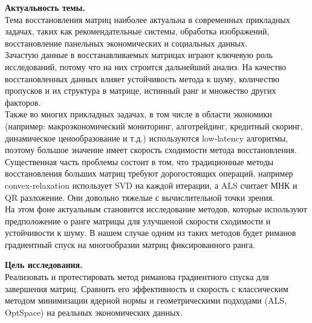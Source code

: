 \documentclass[a4paper,12pt]{article}
\begin{document}
\textbf{Актуальность темы.} \\[5pt] Тема восстановления матриц наиболее актуальна в современных прикладных задачах, таких как рекомендательные системы, обработка изображений, восстановление панельных экономических и социальных данных. \\[5pt] Зачастую данные в восстанавливаемых матрицах играют ключевую роль исследований, потому что на них строится дальнейший анализ. На качество восстановленных данных влияет устойчивость метода к шуму, количество пропусков и их структура в матрице, истинный ранг и множество других факторов. \\[5pt] Также во многих прикладных задачах, в том числе в области экономики (например: макроэкономический мониторинг, алготрейдинг, кредитный скоринг, динамическое ценообразование и т.д.) используются low-latency алгоритмы, поэтому большое значение имеет скорость сходимости метода восстановления. \\[5pt] Существенная часть проблемы состоит в том, что традиционные методы восстановления больших матриц требуют дорогостоящих операций, например convex-relaxation использует SVD на каждой итерации, а ALS считает МНК и QR разложение. Они довольно тяжелые с вычислительной точки зрения. \\[5pt] На этом фоне актуальным становится исследование методов, которые используют предположение о ранге матрицы для улучшеной скорости сходимости и устойчивости к шуму. В нашем случае одним из таких методов будет риманов градиентный спуск на многообразии матриц фиксированного ранга.

\textbf{Цель исследования.} \\[5pt] Реализовать и протестировать метод риманова градиентного спуска для завершения матриц. Сравнить его эффективность и скорость с классическим методом минимизации ядерной нормы и геометрическими подходами (ALS, OptSpace) на реальных экономических данных.
\end{document}
